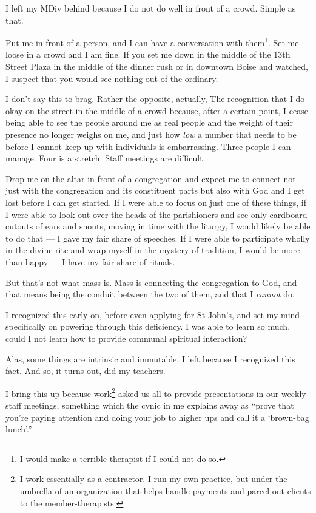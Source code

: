 I left my MDiv behind because I do not do well in front of a crowd. Simple as that.

Put me in front of a person, and I can have a conversation with them\footnote{I would make a terrible therapist if I could not do so.}. Set me loose in a crowd and I am fine. If you set me down in the middle of the 13th Street Plaza in the middle of the dinner rush or in downtown Boise and watched, I suspect that you would see nothing out of the ordinary.

I don't say this to brag. Rather the opposite, actually, The recognition that I do okay on the street in the middle of a crowd because, after a certain point, I cease being able to see the people around me as real people and the weight of their presence no longer weighs on me, and just how \emph{low} a number that needs to be before I cannot keep up with individuals is embarrassing. Three people I can manage. Four is a stretch. Staff meetings are difficult.

Drop me on the altar in front of a congregation and expect me to connect not just with the congregation and its constituent parts but also with God and I get lost before I can get started. If I were able to focus on just one of these things, if I were able to look out over the heads of the parishioners and see only cardboard cutouts of ears and snouts, moving in time with the liturgy, I would likely be able to do that --- I gave my fair share of speeches. If I were able to participate wholly in the divine rite and wrap myself in the mystery of tradition, I would be more than happy --- I have my fair share of rituals.

But that's not what mass is. Mass is connecting the congregation to God, and that means being the conduit between the two of them, and that I \emph{cannot} do.

I recognized this early on, before even applying for St John's, and set my mind specifically on powering through this deficiency. I was able to learn so much, could I not learn how to provide communal spiritual interaction?

Alas, some things are intrinsic and immutable. I left because I recognized this fact. And so, it turns out, did my teachers.

I bring this up because work\footnote{I work essentially as a contractor. I run my own practice, but under the umbrella of an organization that helps handle payments and parcel out clients to the member-therapists.} asked us all to provide presentations in our weekly staff meetings, something which the cynic in me explains away as ``prove that you're paying attention and doing your job to higher ups and call it a `brown-bag lunch'.''

